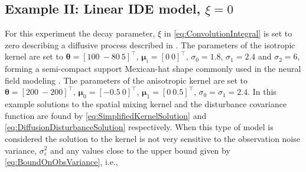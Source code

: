 \documentclass[10pt,twocolumn,twoside]{IEEEtran}
\begin{document}
\subsection{Example II: Linear IDE model, $\xi=0$}
For this experiment the decay parameter, $\xi$ in \eqref{eq:ConvolutionIntegral} is set to zero describing a diffusive process described in \cite{Kot1992,Kot1996,Wikle1999,Xu2005}. The parameters of the isotropic kernel are set to $\boldsymbol\theta=[100~-80~5]^{\top}$,  $\boldsymbol\mu_i=[0~0]^{\top}$, $\sigma_0=1.8$, $\sigma_1=2.4$ and $\sigma_2=6$, forming a semi-compact support Mexican-hat shape commonly used in the neural field modeling \cite{Amari1977,Atay2005,Breakspear2010}. The parameters of the anisotropic kernel are set to $\boldsymbol\theta=[200~-200]^{\top}$, $\boldsymbol\mu_0=[-0.5~0]^{\top}$, $\boldsymbol\mu_1=[0~0.5]^{\top}$, $\sigma_0=\sigma_1=2.4$.  
In this example solutions to the spatial mixing kernel and the disturbance covariance function are found by \eqref{eq:SimplifiedKernelSolution}   and \eqref{eq:DiffusionDisturbanceSolution} respectively. When this type of model is considered the solution to the kernel is not very sensitive to the observation noise variance, $\sigma_{\varepsilon}^2$ and any values close to the upper bound given by \eqref{eq:BoundOnObsVariance}, i.e., 
\end{document}
